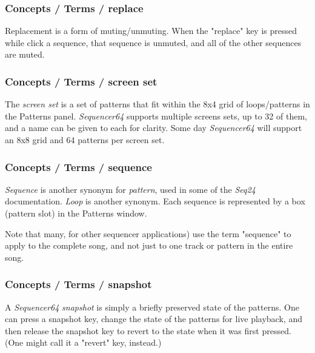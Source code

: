 \subsubsection{Concepts / Terms / replace}
\label{subsubsec:concepts_terms_replace}

   Replacement is a form of muting/unmuting.  When the "replace" key is
   pressed while click a sequence, that sequence is unmuted, and all of the
   other sequences are muted.

\subsubsection{Concepts / Terms / screen set}
\label{subsubsec:concepts_terms_screen_set}

   The \textsl{screen set}
   is a set of patterns that fit within the 8x4 grid of loops/patterns in the
   Patterns panel.
   \textsl{Sequencer64} supports multiple screens sets, up to 32 of them,
   and a name can be given to each for clarity.
   Some day \textsl{Sequencer64} will support an 8x8 grid and 64 patterns per
   screen set.

\subsubsection{Concepts / Terms / sequence}
\label{subsubsec:concepts_terms_sequence}

   \textsl{Sequence} is
   another synonym for \textsl{pattern}, used in some of the \textsl{Seq24}
   documentation.  \textsl{Loop} is another synonym.
   Each sequence is represented by a box (pattern slot) in the Patterns window.

   Note that many, for other sequencer applications) use the term "sequence"
   to apply to the complete song, and not just to one track or pattern in the
   entire song.

\subsubsection{Concepts / Terms / snapshot}
\label{subsubsec:concepts_terms_snapshot}

   A \textsl{Sequencer64} \textsl{snapshot} is simply a briefly preserved
   state of the patterns.  One can press a snapshot key, change the state of
   the patterns for live playback, and then release the snapshot key to
   revert to the state when it was first pressed.  (One might call it a
   "revert" key, instead.)

